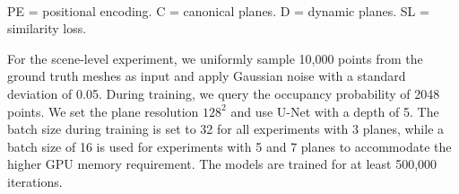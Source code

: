 \documentclass[10pt,twocolumn,letterpaper]{article}
\begin{document}
\begin{table}[b!]
\centering
{}\\
\footnotesize{PE = positional encoding. C = canonical planes. D = dynamic planes. SL = similarity loss.}
\caption{\textbf{Scene-level reconstruction on synthetic rooms.} Our results on the synthetic indoor scene dataset.}

\label{tab:scene_result}
\end{table}

For the scene-level experiment, we uniformly sample 10,000 points from the ground truth meshes as input and apply Gaussian noise with a standard deviation of 0.05. During training, we query the occupancy probability of 2048 points. 
We set the plane resolution $128^2$ and use U-Net with a depth of 5.
The batch size during training is set to 32 for all experiments with 3 planes, while
a batch size of 16 is used for experiments with 5 and 7 planes to accommodate the higher GPU memory requirement. The models are trained for at least 500,000 iterations. 
\end{document}
